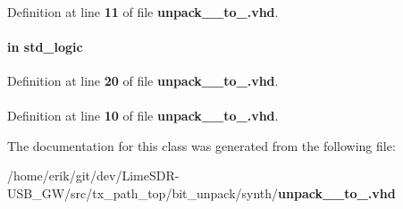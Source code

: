 \paragraph[{numeric\+\_\+std}]{\hspace{0.3cm}{\ttfamily [Package]}}\label{classunpack__64__to__48_a2edc34402b573437d5f25fa90ba4013e}


Definition at line {\bf 11} of file {\bf unpack\+\_\+\_\+to\+\_.\+vhd}.

\paragraph[{reset\+\_\+n}]{ {\bfseries \textcolor{keywordflow}{in}\textcolor{vhdlchar}{ }} {\bfseries \textcolor{comment}{std\+\_\+logic}\textcolor{vhdlchar}{ }} \hspace{0.3cm}{\ttfamily [Port]}}\label{classunpack__64__to__48_a446ea52ed8c4a84181a47d9165ce41a5}


Definition at line {\bf 20} of file {\bf unpack\+\_\+\_\+to\+\_.\+vhd}.

\paragraph[{std\+\_\+logic\+\_\+1164}]{\hspace{0.3cm}{\ttfamily [Package]}}\label{classunpack__64__to__48_acd03516902501cd1c7296a98e22c6fcb}


Definition at line {\bf 10} of file {\bf unpack\+\_\+\_\+to\+\_.\+vhd}.



The documentation for this class was generated from the following file\+:\begin{DoxyCompactItemize}
\item 
/home/erik/git/dev/\+Lime\+S\+D\+R-\/\+U\+S\+B\+\_\+\+G\+W/src/tx\+\_\+path\+\_\+top/bit\+\_\+unpack/synth/{\bf unpack\+\_\+\_\+to\+\_.\+vhd}\end{DoxyCompactItemize}
